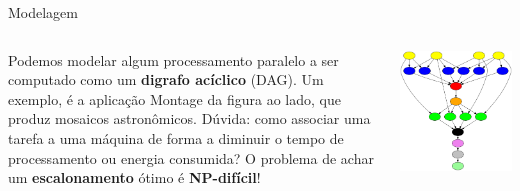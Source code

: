 \documentclass[final]{beamer}
\newcommand{\colorize}[2]{\textbf{\textcolor{#1}{#2}}}
\begin{document}
\begin{frame}[t]
\begin{columns}[t]
\begin{column}{0.35\paperwidth}
	\begin{block}{Modelagem}
	\begin{columns}[totalwidth=0.34\paperwidth]
		\begin{column}{0.17\paperwidth}
			Podemos modelar algum processamento paralelo a ser computado como um
			\colorize{RawSienna}{digrafo acíclico} (DAG). Um exemplo, é a aplicação Montage da figura
			ao lado, que produz mosaicos astronômicos. Dúvida: como associar uma
			tarefa a uma máquina de forma a diminuir o tempo de processamento ou
			energia consumida? O problema de achar um
			\colorize{n_blue}{escalonamento} ótimo é \colorize{n_red}{NP-difícil}!
		\end{column}
		\begin{column}{0.17\paperwidth}
			\begin{center}
				\includegraphics[width=0.9\columnwidth]{Montage_PP.png}
			\end{center}
		\end{column}
	\end{columns}
	\end{block}
\end{column}


\end{columns}
\end{frame}
\end{document}
